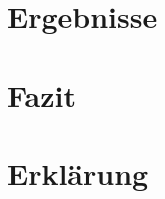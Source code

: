 \documentclass[12pt,a4paper,toc=sectionentrywithdots]{scrartcl}
\begin{document}
\section{Ergebnisse}\label{sec:Ergebnisse}

%
%
%
\newpage
\section{Fazit}\label{sec:Fazit}

%
%
%
\newpage
\section*{Erklärung}

%
%
%
\newpage

%
%
%
%
\end{document}
